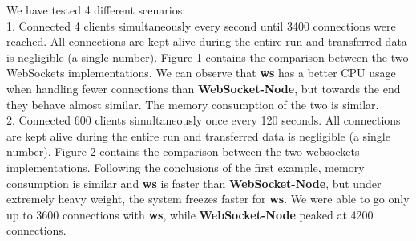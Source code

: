 \documentclass[conference]{IEEEtran}
\begin{document}
We have tested 4 different scenarios:
\\

1. Connected 4 clients simultaneously every second until 3400 connections were reached.
All connections are kept alive during the entire run and transferred data is negligible
(a single number). Figure 1 contains the comparison between the two WebSockets
implementations. We can observe that \textbf{ws} has a better CPU usage when handling
fewer connections than \textbf{WebSocket-Node}, but towards the end they behave almost
similar. The memory consumption of the two is similar.
\\

2. Connected 600 clients simultaneously once every 120 seconds. All connections are
kept alive during the entire run and transferred data is negligible (a single number).
Figure 2 contains the comparison between the two websockets implementations.
Following the conclusions of the first example, memory consumption is similar and
\textbf{ws} is faster than \textbf{WebSocket-Node}, but under extremely heavy weight,
the system freezes faster for \textbf{ws}. We were able to go only up to 3600 connections with \textbf{ws}, while \textbf{WebSocket-Node} peaked at 4200 connections.
\end{document}
